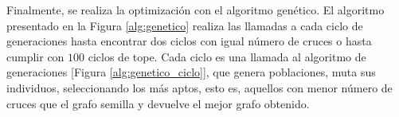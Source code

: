 	Finalmente,  se realiza la optimización con el algoritmo genético. El algoritmo presentado en la Figura \ref{alg:genetico} realiza las llamadas a cada ciclo de generaciones hasta encontrar dos ciclos con igual número de cruces o hasta cumplir con $100$ ciclos de tope. Cada ciclo es una llamada al algoritmo de 	generaciones [Figura \ref{alg:genetico_ciclo}], que genera poblaciones,  muta sus individuos, seleccionando los más aptos, esto es, aquellos  con menor número de cruces que el grafo semilla y devuelve el mejor grafo obtenido.
		

		
	
	
	
	

	

